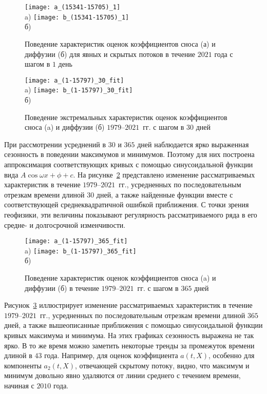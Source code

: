 \begin{figure}[!h]
	\centering
	\texttt{[image: a\_(15341-15705)\_1]}\\
	a)
	\texttt{[image: b\_(15341-15705)\_1]}
	\\
	б)
	
	\caption{Поведение характеристик оценок коэффициентов сноса (а) и диффузии (б) для явных и скрытых потоков в течение $2021$ года с шагом в $1$ день}
	\label{fig:ab_daily}
\end{figure}

\begin{figure}[h!]
	\centering
	\texttt{[image: a\_(1-15797)\_30\_fit]}\\
	a)
	\texttt{[image: b\_(1-15797)\_30\_fit]}\\
	б)
	\caption{Поведение экстремальных характеристик оценок коэффициентов сноса (a) и диффузии (б) $1979$--$2021$~гг. с шагом в $30$ дней}
	\label{fig:ab_monthly}
\end{figure}

При рассмотрении усреднений в $30$ и $365$ дней наблюдается ярко выраженная сезонность в поведении максимумов и минимумов. Поэтому для них построена аппроксимация соответствующих кривых с помощью синусоидальной функции вида $A \cos{\omega x + \phi} + c$. На рисунке~\ref{fig:ab_monthly} представлено изменение рассматриваемых характеристик в течение $1979$--$2021$~гг., усредненных по последовательным отрезкам времени длиной $30$ дней, а также найденные функции вместе с соответствующей среднеквадратичной ошибкой приближения. С точки зрения геофизики, эти величины показывают регулярность рассматриваемого ряда в его средне- и долгосрочной изменчивости.

\begin{figure}[h!]
	\centering
	\texttt{[image: a\_(1-15797)\_365\_fit]}\\
	a)
	\texttt{[image: b\_(1-15797)\_365\_fit]}\\
	б)
	\caption{Поведение характеристик оценок коэффициентов сноса (a) и диффузии (б) в течение $1979$--$2021$~гг. с шагом в $365$ дней}
	\label{fig:ab_year}
\end{figure}

Рисунок~\ref{fig:ab_year} иллюстрирует изменение рассматриваемых характеристик в течение $1979$--$2021$~гг., усредненных по последовательным отрезкам времени длиной $365$ дней, а также вышеописанные приближения с помощью синусоидальной функции кривых максимума и минимума. На этих графиках сезонность выражена не так ярко. В то же время можно заметить некоторые тренды за промежуток времени длиной в $43$ года. Например, для оценок коэффициента $a(t,X)$, особенно для компоненты $a_2(t,X)$, отвечающей скрытому потоку, видно, что максимум и минимум довольно явно удаляются от линии среднего с течением времени, начиная с $2010$ года. 


